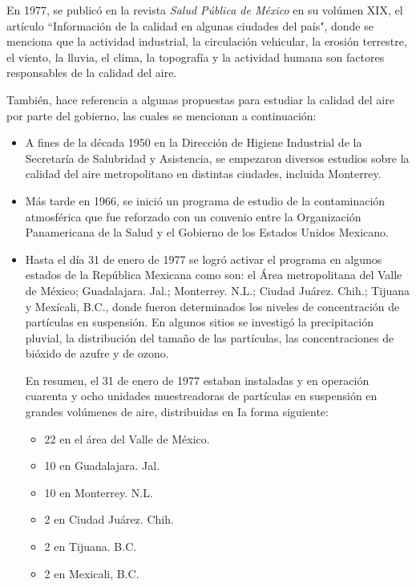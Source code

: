 En 1977, se publicó en la revista \textit{Salud Pública de México} en su volúmen XIX, el artículo ``Información de la calidad en algunas ciudades del país", donde se menciona que la actividad industrial, la circulación vehicular, la erosión terrestre, el viento, la lluvia, el clima, la topografía y la actividad humana son factores responsables de la calidad del aire.

También, hace referencia a algunas propuestas para estudiar la calidad del aire por parte del gobierno, las cuales se mencionan a continuación:

\begin{itemize}
\item A fines de la década 1950 en la Dirección de Higiene Industrial de la Secretaría de Salubridad y Asistencia, se empezaron diversos estudios sobre la calidad del aire metropolitano en distintas ciudades, incluida Monterrey.
\item Más tarde en 1966, se inició un programa de estudio de la contaminación atmosférica que fue reforzado con un convenio entre la Organización Panamericana de la Salud y el Gobierno de los Estados Unidos Mexicano.
\item Hasta el día 31 de enero de 1977 se logró activar el programa en algunos estados de la República Mexicana como son: el Área metropolitana del Valle de México; Guadalajara. Jal.; Monterrey. N.L.; Ciudad Juárez. Chih.; Tijuana y Mexícali, B.C., donde fueron determinados los niveles de concentración de partículas en suspensión. En algunos sitios se investigó la precipitación pluvial,  la distribución del tamaño de las partículas, las concentraciones de bióxido de azufre y de ozono.

En resumen, el 31 de enero de 1977 estaban instaladas y en operación cuarenta y ocho unidades muestreadoras
de partículas en suspensión en grandes volúmenes de aire, distribuidas en Ia forma siguiente:

\begin{itemize}
\item 22 en el área del Valle de México.
\item 10 en Guadalajara. Jal.
\item 10 en Monterrey. N.L.
\item 2 en Ciudad Juárez. Chih.
\item 2 en Tijuana. B.C.
\item 2 en Mexicali, B.C.
\end{itemize}
\end{itemize}

